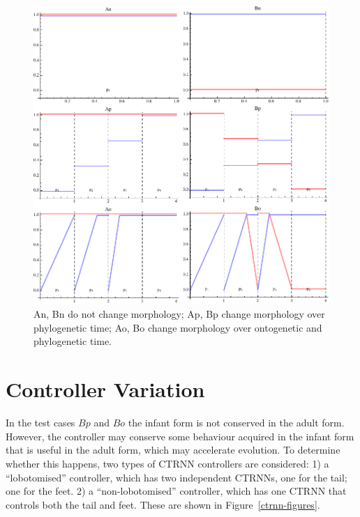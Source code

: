 \begin{figure}
  \centering
  \includegraphics[scale=1.0]{fig/morph-regiment.pdf} 
  \vspace{-15pt}
  \caption[Variations of morphological
    change]{\label{morph-regiment}An, Bn do not change morphology;
    Ap, Bp change morphology over phylogenetic time; Ao, Bo change
    morphology over ontogenetic and phylogenetic time.}

\end{figure}

\section{Controller Variation}

In the test cases $Bp$ and $Bo$ the infant form is not conserved in
the adult form.  However, the controller may conserve some behaviour
acquired in the infant form that is useful in the adult form, which
may accelerate evolution.  To determine whether this happens, two
types of CTRNN controllers are considered: 1) a ``lobotomised''
controller, which has two independent CTRNNs, one for the tail; one
for the feet. 2) a ``non-lobotomised'' controller, which has one CTRNN
that controls both the tail and feet.  These are shown in
Figure~\ref{ctrnn-figures}.

